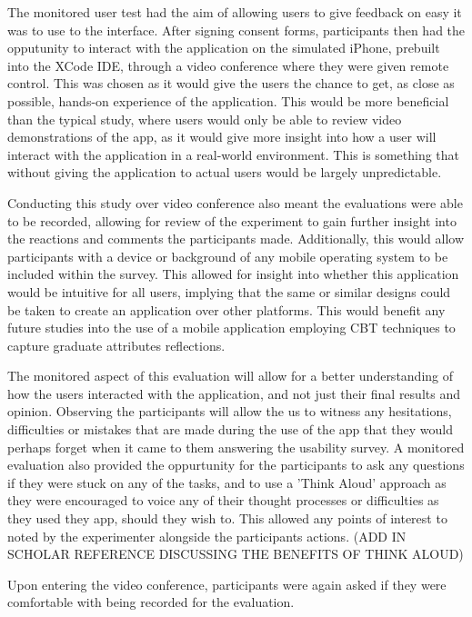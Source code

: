 \documentclass{l4proj}
\begin{document}
The monitored user test had the aim of allowing users to give feedback on easy it was to use to the interface. 
After signing consent forms, participants then had the opputunity to interact with the application on the simulated iPhone, 
prebuilt into the XCode IDE, through a video conference where they were given remote control. This was chosen as it 
would give the users the chance to get, as close as possible, hands-on experience of the application. This would be 
more beneficial than the typical study, where users would only be able to review video demonstrations of the app, as 
it would give more insight into how a user will interact with the application in a real-world environment. This 
is something that without giving the application to actual users would be largely unpredictable. 
\par 
Conducting this study over video conference also meant the evaluations were able to be recorded, allowing for review 
of the experiment to gain further insight into the reactions and comments the participants made. 
Additionally, this would allow participants with a device or background of any mobile operating system to 
be included within the survey. This allowed for insight into whether this application would be intuitive for all 
users, implying that the same or similar designs could be taken to create an application over other platforms. This
would benefit any future studies into the use of a mobile application employing CBT techniques to capture graduate attributes 
reflections. 
\par 
The monitored aspect of this evaluation will allow for a better understanding of how the users interacted
with the application, and not just their final results and opinion. Observing the participants will allow the us to 
witness any hesitations, difficulties or mistakes that are made during the use of the app that they would 
perhaps forget when it came to them answering the usability survey. A monitored evaluation also provided the oppurtunity
for the participants to ask any questions if they were stuck on any of the tasks, and 
to use a 'Think Aloud' approach as they were encouraged to voice any of their thought processes
or difficulties as they used they app, should they wish to. This allowed any points of interest to noted by the 
experimenter alongside the participants actions. (ADD IN SCHOLAR REFERENCE DISCUSSING THE BENEFITS OF THINK ALOUD)
\par 
Upon entering the video conference, participants were again asked if they were comfortable with being recorded for the evaluation. 
\end{document}
